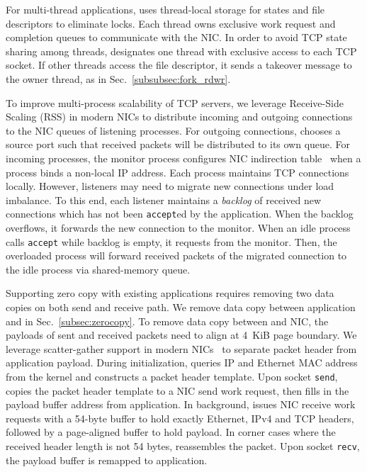 For multi-thread applications, \libipc{} uses thread-local storage for states and file descriptors to eliminate locks. Each thread owns exclusive work request and completion queues to communicate with the NIC. In order to avoid TCP state sharing among threads, \libipc{} designates one thread with exclusive access to each TCP socket. If other threads access the file descriptor, it sends a takeover message to the owner thread, as in Sec.~\ref{subsubsec:fork_rdwr}.

To improve multi-process scalability of TCP servers, we leverage Receive-Side Scaling (RSS) in modern NICs to distribute incoming and outgoing connections to the NIC queues of listening processes. For outgoing connections, \libipc{} chooses a source port such that received packets will be distributed to its own queue. For incoming processes, the monitor process configures NIC indirection table~\cite{mellanox} when a process binds a non-local IP address. Each process maintains TCP connections locally. However, listeners may need to migrate new connections under load imbalance. To this end, each listener maintains a \textit{backlog} of received new connections which has not been \texttt{accept}ed by the application. When the backlog overflows, it forwards the new connection to the monitor. When an idle process calls \texttt{accept} while backlog is empty, it requests from the monitor. Then, the overloaded process will forward received packets of the migrated connection to the idle process via shared-memory queue.

Supporting zero copy with existing applications requires removing two data copies on both send and receive path. We remove data copy between application and \libipc{} in Sec.~\ref{subsec:zerocopy}. To remove data copy between \libipc{} and NIC, the payloads of sent and received packets need to align at 4~KiB page boundary. We leverage scatter-gather support in modern NICs~\cite{mellanox} to separate packet header from application payload. During initialization, \libipc{} queries IP and Ethernet MAC address from the kernel and constructs a packet header template. Upon socket \texttt{send}, \libipc{} copies the packet header template to a NIC send work request, then fills in the payload buffer address from application. In background, \libipc{} issues NIC receive work requests with a 54-byte buffer to hold exactly Ethernet, IPv4 and TCP headers, followed by a page-aligned buffer to hold payload. In corner cases where the received header length is not 54 bytes, \libipc{} reassembles the packet. Upon socket \texttt{recv}, the payload buffer is remapped to application.
